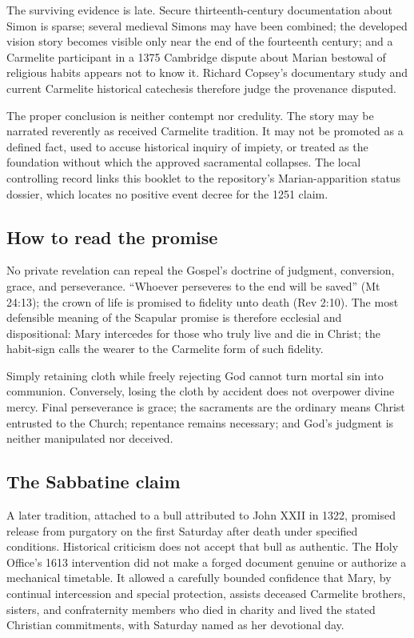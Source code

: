The surviving evidence is late. Secure thirteenth-century documentation about Simon is sparse; several medieval Simons may have been combined; the developed vision story becomes visible only near the end of the fourteenth century; and a Carmelite participant in a 1375 Cambridge dispute about Marian bestowal of religious habits appears not to know it. Richard Copsey's documentary study and current Carmelite historical catechesis therefore judge the provenance disputed.

The proper conclusion is neither contempt nor credulity. The story may be narrated reverently as received Carmelite tradition. It may not be promoted as a defined fact, used to accuse historical inquiry of impiety, or treated as the foundation without which the approved sacramental collapses. The local controlling record links this booklet to the repository's Marian-apparition status dossier, which locates no positive event decree for the 1251 claim.

\subsection{How to read the promise}

No private revelation can repeal the Gospel's doctrine of judgment, conversion, grace, and perseverance. ``Whoever perseveres to the end will be saved'' (Mt 24:13); the crown of life is promised to fidelity unto death (Rev 2:10). The most defensible meaning of the Scapular promise is therefore ecclesial and dispositional: Mary intercedes for those who truly live and die in Christ; the habit-sign calls the wearer to the Carmelite form of such fidelity.

Simply retaining cloth while freely rejecting God cannot turn mortal sin into communion. Conversely, losing the cloth by accident does not overpower divine mercy. Final perseverance is grace; the sacraments are the ordinary means Christ entrusted to the Church; repentance remains necessary; and God's judgment is neither manipulated nor deceived.

\subsection{The Sabbatine claim}

A later tradition, attached to a bull attributed to John XXII in 1322, promised release from purgatory on the first Saturday after death under specified conditions. Historical criticism does not accept that bull as authentic. The Holy Office's 1613 intervention did not make a forged document genuine or authorize a mechanical timetable. It allowed a carefully bounded confidence that Mary, by continual intercession and special protection, assists deceased Carmelite brothers, sisters, and confraternity members who died in charity and lived the stated Christian commitments, with Saturday named as her devotional day.

